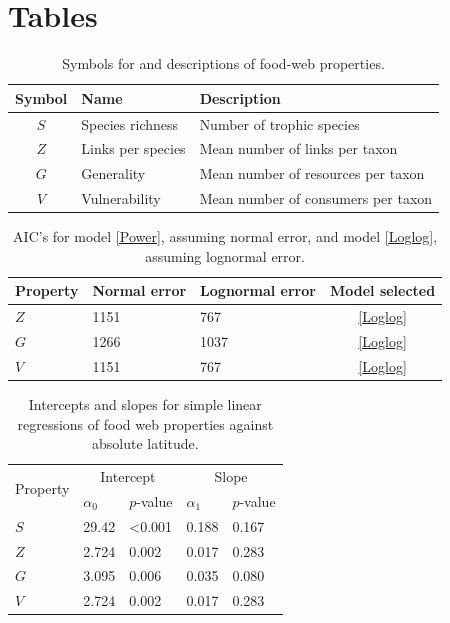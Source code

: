 \documentclass[12pt]{article}
\begin{document}
\newpage

\section*{Tables}

\begin{center}
\begin{table}[!h]
\caption{Symbols for and descriptions of food-web properties.}
\label{symboltable}
\begin{tabular}{c l l}
\hline
Symbol      & Name & Description \\
\hline
$S$ & Species richness & Number of trophic species \\
$Z$ & Links per species & Mean number of links per taxon \\
$G$ & Generality & Mean number of resources per taxon \\
$V$ & Vulnerability & Mean number of consumers per taxon \\
\hline
\end{tabular}
\end{table}
\end{center}


\begin{table}[!t]

\caption{AIC's for model \ref{Power}, assuming normal error, and model \ref{Loglog}, assuming lognormal error.}
\label{Errorfits}
\begin{tabular}{l | l l | c}
Property & Normal error & Lognormal error & Model selected \\
\hline
$Z$ & 1151 &  767 & \ref{Loglog} \\
$G$ & 1266 & 1037 & \ref{Loglog} \\
$V$ & 1151 & 767 & \ref{Loglog} \\
\end{tabular}
\end{table}


\begin{table}[!h]
\caption{Intercepts and slopes for simple linear regressions of food web properties against absolute latitude.}
\label{Latlms}
\begin{tabular}{l | l l | l l}

\multirow{2}{*}{Property} & \multicolumn{2}{|c}{Intercept} & \multicolumn{2}{|c}{Slope} \\
                      & $\alpha_{0}$ & $p$-value & $\alpha_{1}$ & $p$-value \\
\hline
$S$ & 29.42 & \textless0.001 & 0.188 & 0.167 \\
$Z$ & 2.724 & 0.002          & 0.017 & 0.283 \\
$G$ & 3.095 & 0.006          & 0.035 & 0.080 \\
$V$ & 2.724 & 0.002          & 0.017 & 0.283 \\
\end{tabular}
\end{table}
\end{document}

